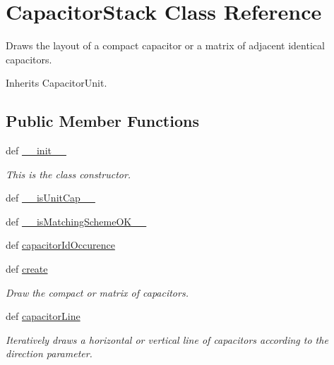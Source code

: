 \hypertarget{classpython_1_1CapacitorMatrix_1_1CapacitorStack}{\section{Capacitor\-Stack Class Reference}
\label{classpython_1_1CapacitorMatrix_1_1CapacitorStack}
}


Draws the layout of a compact capacitor or a matrix of adjacent identical capacitors.  




Inherits Capacitor\-Unit.

\subsection*{Public Member Functions}
\begin{DoxyCompactItemize}
\item 
def \hyperlink{classpython_1_1CapacitorMatrix_1_1CapacitorStack_ac775ee34451fdfa742b318538164070e}{\-\_\-\-\_\-init\-\_\-\-\_\-}
\begin{DoxyCompactList}\small\item\em This is the class constructor. \end{DoxyCompactList}\item 
def \hyperlink{classpython_1_1CapacitorMatrix_1_1CapacitorStack_a4b59d20a15f0e548ed19c24814efbeb6}{\-\_\-\-\_\-is\-Unit\-Cap\-\_\-\-\_\-}
\item 
def \hyperlink{classpython_1_1CapacitorMatrix_1_1CapacitorStack_a8dbb6274d6cdbb570bdea61d09e54e73}{\-\_\-\-\_\-is\-Matching\-Scheme\-O\-K\-\_\-\-\_\-}
\item 
def \hyperlink{classpython_1_1CapacitorMatrix_1_1CapacitorStack_a8540eb76875171b18a3ae9e5e5f56fd3}{capacitor\-Id\-Occurence}
\item 
def \hyperlink{classpython_1_1CapacitorMatrix_1_1CapacitorStack_a5b7ef0221e471e99fa7f0a87a28ba1ea}{create}
\begin{DoxyCompactList}\small\item\em Draw the compact or matrix of capacitors. \end{DoxyCompactList}\item 
def \hyperlink{classpython_1_1CapacitorMatrix_1_1CapacitorStack_a0357fcbd57878fb26a1b994b13bb0cf7}{capacitor\-Line}
\begin{DoxyCompactList}\small\item\em Iteratively draws a horizontal or vertical line of capacitors according to the {\ttfamily direction} parameter. \end{DoxyCompactList}\item 

\end{DoxyCompactItemize}

